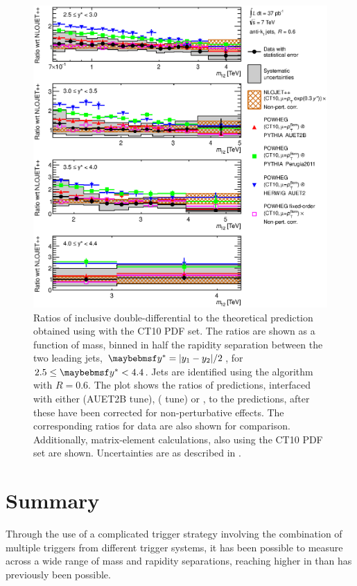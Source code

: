 \begin{figure}
  \includegraphics[width=\largefigwidth]{chapters/dijets/DijetMassYStarRatioFinal06_forward.eps}
  \caption{Ratios of inclusive \dijet double-differential \xs to the theoretical
     prediction obtained using \NLOjetpp with the CT10 PDF set. The ratios
     are shown as a function of \dijet mass, binned in half the rapidity separation
     between the two leading jets, $\yStar = |y_1 - y_2|/2$, for $2.5 \leq \yStar < 4.4$.
     Jets are identified using the \akt algorithm with $R=0.6$. The plot shows the
     ratios of \Powheg predictions, interfaced with either \Pythia (AUET2B tune), \Pythia
     ( tune) or \Herwig, to the \NLOjetpp predictions, after these have
     been corrected for non-perturbative effects. The corresponding ratios for data
     are also shown for comparison. Additionally, \Powheg matrix-element calculations,
     also using the CT10 PDF set are shown. Uncertainties are as described in
     .}
  \label{fig:dijets:PowhegRatio_akt6_forward}
\end{figure}



\section{Summary}
Through the use of a complicated trigger strategy involving the combination of
multiple triggers from different trigger systems, it has been possible to
measure \dijet {} across a wide range of mass and rapidity separations,
reaching higher in \yStar than has previously been possible.


